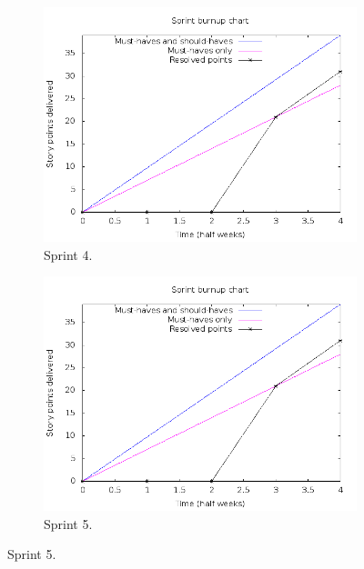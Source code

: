 \documentclass[a4paper,11pt]{article}
\begin{document}
\begin{figure}[!ht]
	\begin{subfigure}[b]{0.4\textwidth}
		\centering
		\centering
		\includegraphics[width=\textwidth]{img/burnup_sprint_5.png}
		\caption{Sprint 4.}
	\end{subfigure}
	\begin{subfigure}[b]{0.4\textwidth}
		\centering
		\centering
		\includegraphics[width=\textwidth]{img/burnup.png}
		\caption{Sprint 5.}
	\end{subfigure}
	\label{Collection of burnup graphs for this Pretested Integration project.}
\end{figure}
\end{document}
